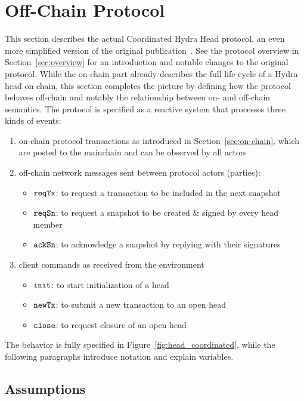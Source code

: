 \section{Off-Chain Protocol}\label{sec:offchain}

This section describes the actual Coordinated Hydra Head protocol, an even more
simplified version of the original publication~\cite{hydrahead20}. See the
protocol overview in Section~\ref{sec:overview} for an introduction and notable
changes to the original protocol. While the on-chain part already describes the
full life-cycle of a Hydra head on-chain, this section completes the picture by
defining how the protocol behaves off-chain and notably the relationship between
on- and off-chain semantics. The protocol is specified as a reactive system that
processes three kinds of events:
\begin{enumerate}
  \item on-chain protocol transactions as introduced in
        Section~\ref{sec:on-chain}, which are posted to the mainchain and can be
        observed by all actors
  \item off-chain network messages sent between protocol actors (parties):
    \begin{itemize}
      \item $\mathtt{reqTx}$: to request a transaction to be included in the next snapshot
      \item $\mathtt{reqSn}$: to request a snapshot to be created \& signed by every head member
      \item $\mathtt{ackSn}$: to acknowledge a snapshot by replying with their signatures
    \end{itemize}
  \item client commands as received from the environment
    \begin{itemize}
      \item $\mathtt{init}$: to start initialization of a head
      \item $\mathtt{newTx}$: to submit a new transaction to an open head
      \item $\mathtt{close}$: to request closure of an open head
    \end{itemize}
\end{enumerate}

The behavior is fully specified in Figure~\ref{fig:head_coordinated}, while the
following paragraphs introduce notation and explain variables.

\subsection{Assumptions}

